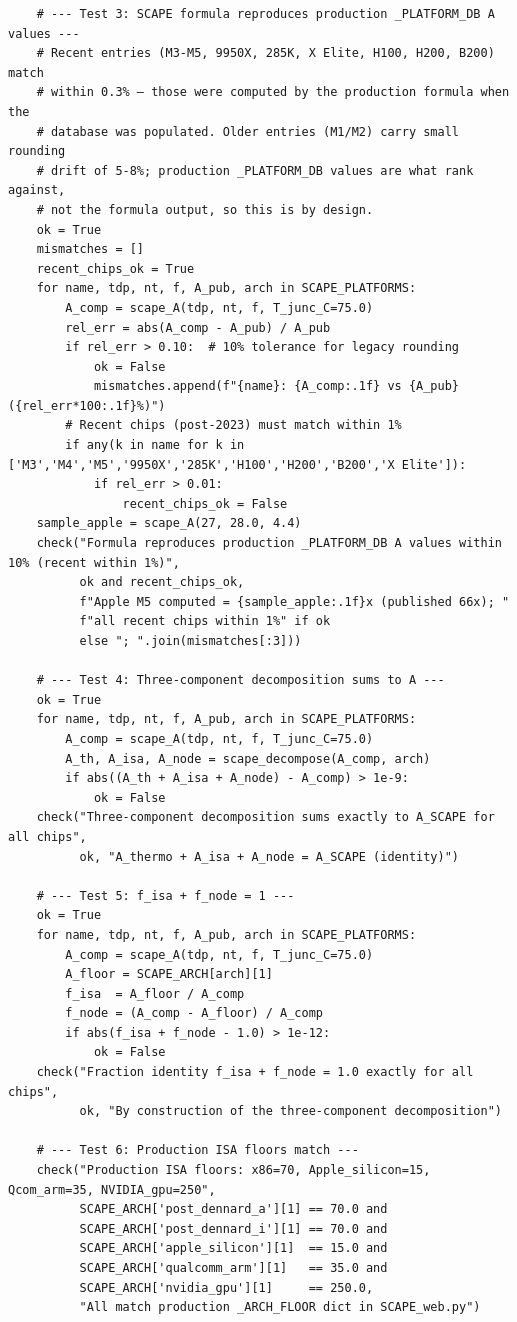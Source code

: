 \documentclass[12pt,a4paper]{article}
\begin{document}
\begin{verbatim}
    # --- Test 3: SCAPE formula reproduces production _PLATFORM_DB A values ---
    # Recent entries (M3-M5, 9950X, 285K, X Elite, H100, H200, B200) match
    # within 0.3% — those were computed by the production formula when the
    # database was populated. Older entries (M1/M2) carry small rounding
    # drift of 5-8%; production _PLATFORM_DB values are what rank against,
    # not the formula output, so this is by design.
    ok = True
    mismatches = []
    recent_chips_ok = True
    for name, tdp, nt, f, A_pub, arch in SCAPE_PLATFORMS:
        A_comp = scape_A(tdp, nt, f, T_junc_C=75.0)
        rel_err = abs(A_comp - A_pub) / A_pub
        if rel_err > 0.10:  # 10% tolerance for legacy rounding
            ok = False
            mismatches.append(f"{name}: {A_comp:.1f} vs {A_pub} ({rel_err*100:.1f}%)")
        # Recent chips (post-2023) must match within 1%
        if any(k in name for k in ['M3','M4','M5','9950X','285K','H100','H200','B200','X Elite']):
            if rel_err > 0.01:
                recent_chips_ok = False
    sample_apple = scape_A(27, 28.0, 4.4)
    check("Formula reproduces production _PLATFORM_DB A values within 10% (recent within 1%)",
          ok and recent_chips_ok,
          f"Apple M5 computed = {sample_apple:.1f}x (published 66x); "
          f"all recent chips within 1%" if ok
          else "; ".join(mismatches[:3]))

    # --- Test 4: Three-component decomposition sums to A ---
    ok = True
    for name, tdp, nt, f, A_pub, arch in SCAPE_PLATFORMS:
        A_comp = scape_A(tdp, nt, f, T_junc_C=75.0)
        A_th, A_isa, A_node = scape_decompose(A_comp, arch)
        if abs((A_th + A_isa + A_node) - A_comp) > 1e-9:
            ok = False
    check("Three-component decomposition sums exactly to A_SCAPE for all chips",
          ok, "A_thermo + A_isa + A_node = A_SCAPE (identity)")

    # --- Test 5: f_isa + f_node = 1 ---
    ok = True
    for name, tdp, nt, f, A_pub, arch in SCAPE_PLATFORMS:
        A_comp = scape_A(tdp, nt, f, T_junc_C=75.0)
        A_floor = SCAPE_ARCH[arch][1]
        f_isa  = A_floor / A_comp
        f_node = (A_comp - A_floor) / A_comp
        if abs(f_isa + f_node - 1.0) > 1e-12:
            ok = False
    check("Fraction identity f_isa + f_node = 1.0 exactly for all chips",
          ok, "By construction of the three-component decomposition")

    # --- Test 6: Production ISA floors match ---
    check("Production ISA floors: x86=70, Apple_silicon=15, Qcom_arm=35, NVIDIA_gpu=250",
          SCAPE_ARCH['post_dennard_a'][1] == 70.0 and
          SCAPE_ARCH['post_dennard_i'][1] == 70.0 and
          SCAPE_ARCH['apple_silicon'][1]  == 15.0 and
          SCAPE_ARCH['qualcomm_arm'][1]   == 35.0 and
          SCAPE_ARCH['nvidia_gpu'][1]     == 250.0,
          "All match production _ARCH_FLOOR dict in SCAPE_web.py")


\end{verbatim}
\end{document}
